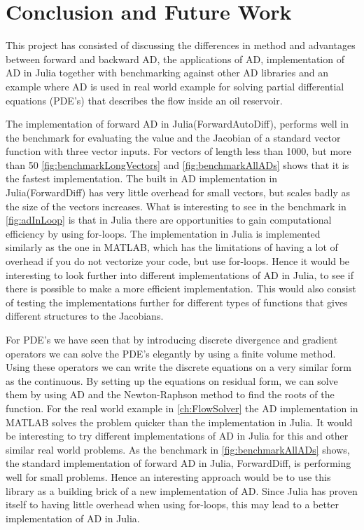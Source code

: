 \chapter{Conclusion and Future Work}
\label{ch:Conclusion}
This project has consisted of discussing the differences in method and advantages between forward and backward AD, the applications of AD, implementation of AD in Julia together with benchmarking against other AD libraries and an example where AD is used in real world example for solving partial differential equations (PDE's) that describes the flow inside an oil reservoir.


The implementation of forward AD in Julia(ForwardAutoDiff), performs well in the benchmark for evaluating the value and the Jacobian of a standard vector function with three vector inputs. For vectors of length less than 1000, but more than 50 \autoref{fig:benchmarkLongVectors} and \autoref{fig:benchmarkAllADs} shows that it is the fastest implementation. The built in AD implementation in Julia(ForwardDiff) has very little overhead for small vectors, but scales badly as the size of the vectors increases. What is interesting to see in the benchmark in \autoref{fig:adInLoop} is that in Julia there are opportunities to gain computational efficiency by using for-loops. The implementation in Julia is implemented similarly as the one in MATLAB, which has the limitations of having a lot of overhead if you do not vectorize your code, but use for-loops. Hence it would be interesting to look further into different implementations of AD in Julia, to see if there is possible to make a more efficient implementation. This would also consist of testing the implementations further for different types of functions that gives different structures to the Jacobians. 

For PDE's we have seen that by introducing discrete divergence and gradient operators we can solve the PDE's elegantly by using a finite volume method. Using these operators we can write the discrete equations on a very similar form as the continuous. By setting up the equations on residual form, we can solve them by using AD and the Newton-Raphson method to find the roots of the function. For the real world example in \autoref{ch:FlowSolver} the AD implementation in MATLAB solves the problem quicker than the implementation in Julia. It would be interesting to try different implementations of AD in Julia for this and other similar real world problems. As the benchmark in \autoref{fig:benchmarkAllADs} shows, the standard implementation of forward AD in Julia, ForwardDiff, is performing well for small problems. Hence an interesting approach would be to use this library as a building brick of a new implementation of AD. Since Julia has proven itself to having little overhead when using for-loops, this may lead to a better implementation of AD in Julia.

